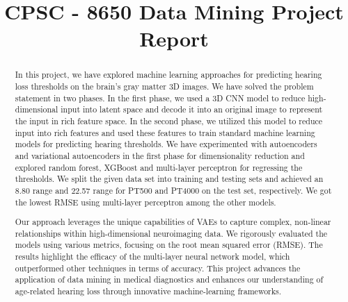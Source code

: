 \documentclass[conference,compsoc]{IEEEtran}
\begin{document}
\pagestyle{plain}
\title{CPSC - 8650 Data Mining Project Report}
\author{
	\and
	\and
	}

\maketitle
\begin{abstract}
	
	In this project, we have explored machine learning approaches for predicting hearing loss thresholds on the brain's gray matter 3D images. We have solved the problem statement in two phases. In the first phase, we used a 3D CNN model to reduce high-dimensional input into latent space and decode it into an original image to represent the input in rich feature space. In the second phase, we utilized this model to reduce input into rich features and used these features to train standard machine learning models for predicting hearing thresholds. We have experimented with autoencoders and variational autoencoders in the first phase for dimensionality reduction and explored random forest, XGBoost and multi-layer perceptron for regressing the thresholds. We split the given data set into training and testing sets and achieved an 8.80 range and 22.57 range for PT500 and PT4000 on the test set, respectively. We got the lowest RMSE using multi-layer perceptron among the other models.
	
	Our approach leverages the unique capabilities of VAEs to capture complex, non-linear relationships within high-dimensional neuroimaging data. We rigorously evaluated the models using various metrics, focusing on the root mean squared error (RMSE). The results highlight the efficacy of the multi-layer neural network model, which outperformed other techniques in terms of accuracy. This project advances the application of data mining in medical diagnostics and enhances our understanding of age-related hearing loss through innovative machine-learning frameworks.
\end{abstract}
\end{document}
